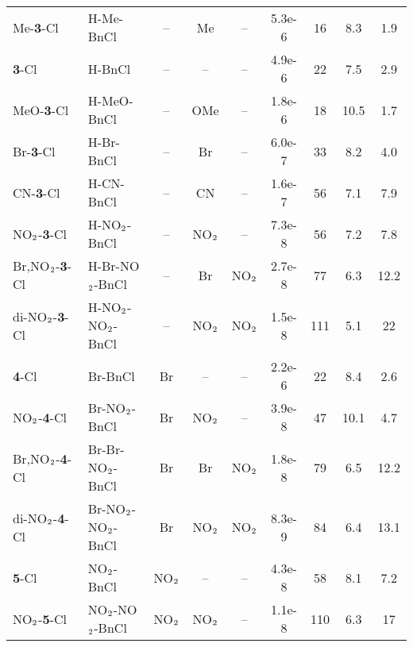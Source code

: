 \begin{table*}[h!]
\begin{tabular}{l l c c c S S S S}
\noalign{\medskip}        
Me-\textbf{3}-Cl              &   H-Me-BnCl                       &  --           &  Me             &  --           &      5.3e-6    &   16    &   8.3   &   1.9 \\
\textbf{3}-Cl                 &   H-BnCl                          &  --           &   --            &  --           &      4.9e-6    &   22    &   7.5   &   2.9 \\
MeO-\textbf{3}-Cl             &   H-MeO-BnCl                      &  --           &  OMe            &  --           &      1.8e-6    &   18    &   10.5  &   1.7 \\
Br-\textbf{3}-Cl              &   H-Br-BnCl                       &  --           &  Br             &  --           &      6.0e-7    &   33    &   8.2   &   4.0 \\
CN-\textbf{3}-Cl              &   H-CN-BnCl                       &  --           &  CN             &  --           &      1.6e-7    &   56    &   7.1   &   7.9 \\
NO$\rm _2$-\textbf{3}-Cl      &   H-NO$\rm _2$-BnCl               &  --           &  NO$\rm _2$     &  --           &      7.3e-8    &   56    &   7.2   &   7.8 \\
Br,NO$\rm _2$-\textbf{3}-Cl   &   H-Br-NO$\rm _2$-BnCl            &  --           &  Br             &  NO$\rm _2$   &      2.7e-8    &   77    &   6.3   &   12.2 \\
di-NO$\rm _2$-\textbf{3}-Cl   &   H-NO$\rm _2$-NO$\rm _2$-BnCl    &  --           &  NO$\rm _2$     &  NO$\rm _2$   &      1.5e-8    &   111   &   5.1   &   22 \\
\noalign{\medskip}        
\textbf{4}-Cl                 &   Br-BnCl                         &  Br           &   --            &  --           &      2.2e-6    &   22    &   8.4   &   2.6  \\
NO$\rm _2$-\textbf{4}-Cl      &   Br-NO$\rm _2$-BnCl              &  Br           &  NO$\rm _2$     &  --           &      3.9e-8    &   47    &   10.1  &   4.7  \\
Br,NO$\rm _2$-\textbf{4}-Cl   &   Br-Br-NO$\rm _2$-BnCl           &  Br           &  Br             &  NO$\rm _2$   &      1.8e-8    &   79    &   6.5   &   12.2 \\
di-NO$\rm _2$-\textbf{4}-Cl   &   Br-NO$\rm _2$-NO$\rm _2$-BnCl   &  Br           &  NO$\rm _2$     &  NO$\rm _2$   &      8.3e-9    &   84    &   6.4   &   13.1 \\
\noalign{\medskip}
\textbf{5}-Cl                 &   NO$\rm _2$-BnCl                 &  NO$\rm _2$   &   --            &  --           &      4.3e-8    &   58    &   8.1   &   7.2 \\
NO$\rm _2$-\textbf{5}-Cl      &   NO$\rm _2$-NO$\rm _2$-BnCl      &  NO$\rm _2$   &  NO$\rm _2$     &  --           &      1.1e-8    &   110   &   6.3   &   17 \\



    \end{tabular}
    \label{tab:1}
\end{table*}


